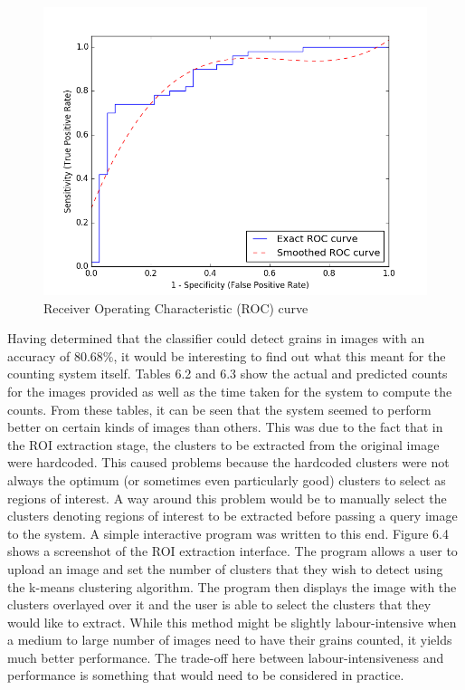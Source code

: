 \begin{figure}[ht!]
\centering
\includegraphics[scale=0.5]{Images/roc.png}
\caption{Receiver Operating Characteristic (ROC) curve}
\label{fig1}
\end{figure}
%
Having determined that the classifier could detect grains in images with an accuracy of $80.68\%$, it would be interesting to find out what this meant for the counting system itself. Tables 6.2 and 6.3 show the actual and predicted counts for the images provided as well as the time taken for the system to compute the counts. From these tables, it can be seen that the system seemed to perform better on certain kinds of images than others. This was due to the fact that in the ROI extraction stage, the clusters to be extracted from the original image were hardcoded. This caused problems because the hardcoded clusters were not always the optimum (or sometimes even particularly good) clusters to select as regions of interest. A way around this problem would be to manually select the clusters denoting regions of interest to be extracted before passing a query image to the system. A simple interactive program was written to this end. Figure 6.4 shows a screenshot of the ROI extraction interface. The program allows a user to upload an image and set the number of clusters that they wish to detect using the k-means clustering algorithm. The program then displays the image with the clusters overlayed over it and the user is able to select the clusters that they would like to extract. While this method might be slightly labour-intensive when a medium to large number of images need to have their grains counted, it yields much better performance. The trade-off here between labour-intensiveness and performance is something that would need to be considered in practice.
